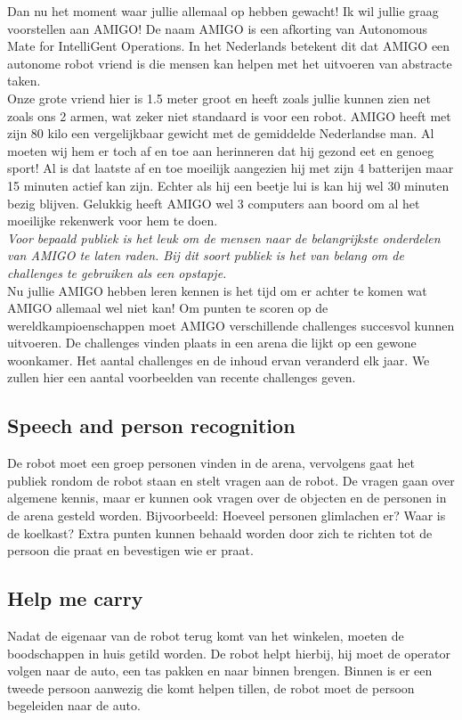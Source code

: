 \documentclass[a4paper,10pt]{article}
\numberwithin{equation}{section}
\numberwithin{figure}{section}
\numberwithin{table}{section}
\begin{document}
Dan nu het moment waar jullie allemaal op hebben gewacht! Ik wil jullie graag voorstellen aan AMIGO! De naam AMIGO is een afkorting van Autonomous Mate for IntelliGent Operations. In het Nederlands betekent dit dat AMIGO een autonome robot vriend is die mensen kan helpen met het uitvoeren van abstracte taken. \\

Onze grote vriend hier is 1.5 meter groot en heeft zoals jullie kunnen zien net zoals ons 2 armen, wat zeker niet standaard is voor een robot. AMIGO heeft met zijn 80 kilo een vergelijkbaar gewicht met de gemiddelde Nederlandse man. Al moeten wij hem er toch af en toe aan herinneren dat hij gezond eet en genoeg sport!
Al is dat laatste af en toe moeilijk aangezien hij met zijn 4 batterijen maar 15 minuten actief kan zijn. Echter als hij een beetje lui is kan hij wel 30 minuten bezig blijven. Gelukkig heeft AMIGO wel 3 computers aan boord om al het moeilijke rekenwerk voor hem te doen.\\

\textit{Voor bepaald publiek is het leuk om de mensen naar de belangrijkste onderdelen van AMIGO te laten raden. Bij dit soort publiek is het van belang om de challenges te gebruiken als een opstapje.}\\

Nu jullie AMIGO hebben leren kennen is het tijd om er achter te komen wat AMIGO allemaal wel niet kan! Om punten te scoren op de wereldkampioenschappen moet AMIGO verschillende challenges succesvol kunnen uitvoeren. De challenges vinden plaats in een arena die lijkt op een gewone woonkamer. Het aantal challenges en de inhoud ervan veranderd elk jaar. We zullen hier een aantal voorbeelden van recente challenges geven.

\subsection*{Speech and person recognition}
De robot moet een groep personen vinden in de arena, vervolgens gaat het publiek rondom de robot staan en stelt vragen aan de robot. De vragen gaan over algemene kennis, maar er kunnen ook vragen over de objecten en de personen in de arena gesteld worden. Bijvoorbeeld: Hoeveel personen glimlachen er? Waar is de koelkast? Extra punten kunnen behaald worden door zich te richten tot de persoon die praat en bevestigen wie er praat. 

\subsection*{Help me carry}
Nadat de eigenaar van de robot terug komt van het winkelen, moeten de boodschappen in huis getild worden. De robot helpt hierbij, hij moet de operator volgen naar de auto, een tas pakken en naar binnen brengen. Binnen is er een tweede persoon aanwezig die komt helpen tillen, de robot moet de persoon begeleiden naar de auto.
\end{document}
